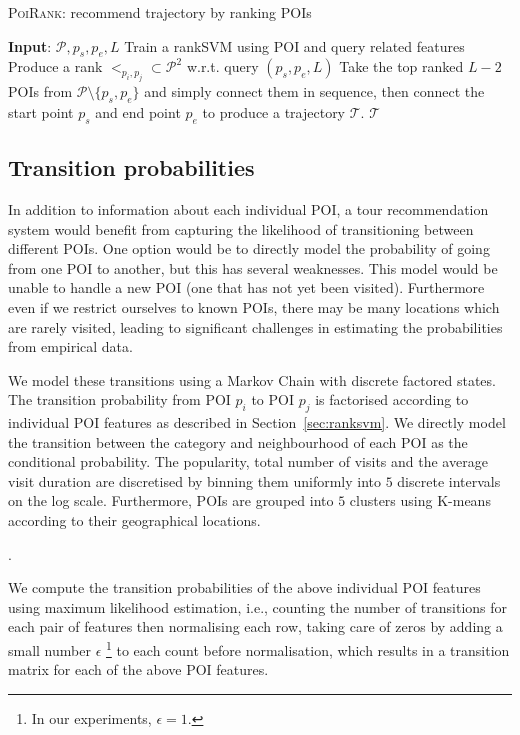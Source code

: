 \begin{algorithm}
\caption{\textsc{PoiRank}: recommend trajectory by ranking POIs}
\label{alg:poirank}
\begin{algorithmic}[1]
\STATE \textbf{Input}: $\mathcal{P}, p_s, p_e, L$ 
\STATE Train a rankSVM using POI and query related features
\STATE Produce a rank $<_{p_i, p_j} \subset \mathcal{P}^2$ w.r.t. query $(p_s, p_e, L)$
\STATE Take the top ranked $L-2$ POIs from $\mathcal{P} \setminus \{p_s, p_e\}$ and simply connect them in sequence, 
       then connect the start point $p_s$ and end point $p_e$ to produce a trajectory $\mathcal{T}$.
\RETURN $\mathcal{T}$
\end{algorithmic}
\end{algorithm}


\subsection{Transition probabilities}
\label{sec:transition}

In addition to information about each individual POI, a tour recommendation system would benefit
from capturing the likelihood of transitioning between different POIs. One option would be to
directly model the probability of going from one POI to another, but this has several weaknesses.
This model would be unable to handle a new POI (one that has not yet been visited).
Furthermore even if we restrict ourselves to known POIs, there may be many locations which
are rarely visited, leading to significant challenges in estimating the probabilities from
empirical data.

We model these transitions using a Markov Chain with discrete factored states.
The transition probability from POI $p_i$ to POI $p_j$ is factorised according to
individual POI features as described in Section~\ref{sec:ranksvm}. We directly model
the transition between the category and neighbourhood of each POI as the conditional probability.
The popularity, total number of visits and the average visit duration are discretised by binning 
them uniformly into $5$ discrete intervals on the log scale.
Furthermore, POIs are grouped into $5$ clusters using K-means according to their geographical locations.

.


We compute the transition probabilities of the above individual POI features
using maximum likelihood estimation,
i.e., counting the number of transitions for each pair of features then normalising each row,
taking care of zeros by adding a small number $\epsilon$
\footnote{In our experiments, $\epsilon = 1$.}
to each count before normalisation,
which results in a transition matrix for each of the above POI features.

